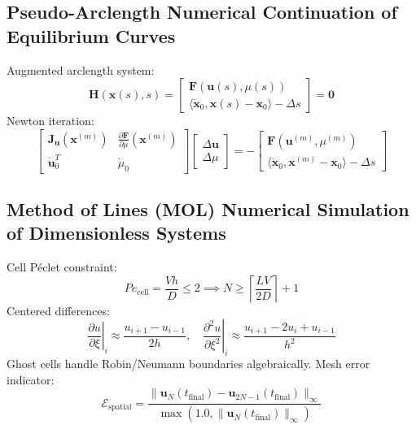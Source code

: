\documentclass[11pt,a4paper]{article}
\begin{document}
\subsection{Pseudo-Arclength Numerical Continuation of Equilibrium Curves}

Augmented arclength system:
\begin{equation}
\mathbf{H}(\mathbf{x}(s), s) = \begin{bmatrix} \mathbf{F}(\mathbf{u}(s), \mu(s)) \\ \langle \dot{\mathbf{x}}_0, \mathbf{x}(s) - \mathbf{x}_0 \rangle - \Delta s \end{bmatrix} = \mathbf{0}
\end{equation}
Newton iteration:
\begin{equation}
\begin{bmatrix} \mathbf{J}_{\mathbf{u}}(\mathbf{x}^{(m)}) & \frac{\partial \mathbf{F}}{\partial \mu}(\mathbf{x}^{(m)}) \\ \dot{\mathbf{u}}_0^T & \dot{\mu}_0 \end{bmatrix} \begin{bmatrix} \Delta \mathbf{u} \\ \Delta \mu \end{bmatrix} = -\begin{bmatrix} \mathbf{F}(\mathbf{u}^{(m)}, \mu^{(m)}) \\ \langle \dot{\mathbf{x}}_0, \mathbf{x}^{(m)} - \mathbf{x}_0 \rangle - \Delta s \end{bmatrix}
\end{equation}

\subsection{Method of Lines (MOL) Numerical Simulation of Dimensionless Systems}

Cell P\'eclet constraint:
\begin{equation}
Pe_{\text{cell}} = \frac{V h}{D} \le 2 \implies N \ge \left\lceil \frac{L V}{2 D} \right\rceil + 1
\end{equation}
Centered differences:
\begin{equation}
\left. \frac{\partial u}{\partial \xi} \right|_i \approx \frac{u_{i+1} - u_{i-1}}{2h}, \quad \left. \frac{\partial^2 u}{\partial \xi^2} \right|_i \approx \frac{u_{i+1} - 2u_i + u_{i-1}}{h^2}
\end{equation}
Ghost cells handle Robin/Neumann boundaries algebraically. Mesh error indicator:
\begin{equation}
\mathcal{E}_{\text{spatial}} = \frac{\| \mathbf{u}_N(t_{\text{final}}) - \mathbf{u}_{2N-1}(t_{\text{final}}) \|_\infty}{\max\left( 1.0, \| \mathbf{u}_N(t_{\text{final}}) \|_\infty \right)}
\end{equation}
\end{document}
